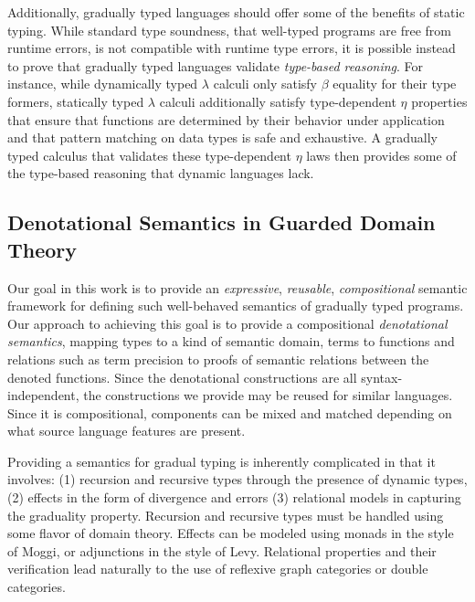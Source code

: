Additionally, gradually typed languages should offer some of the
benefits of static typing. While standard type soundness, that
well-typed programs are free from runtime errors, is not compatible
with runtime type errors, it is possible instead to prove that
gradually typed languages validate \emph{type-based reasoning}. For
instance, while dynamically typed $\lambda$ calculi only satisfy
$\beta$ equality for their type formers, statically typed $\lambda$
calculi additionally satisfy type-dependent $\eta$ properties that
ensure that functions are determined by their behavior under
application and that pattern matching on data types is safe and
exhaustive. A gradually typed calculus that validates these
type-dependent $\eta$ laws then provides some of the type-based
reasoning that dynamic languages lack.


\subsection{Denotational Semantics in Guarded Domain Theory}

Our goal in this work is to provide an \emph{expressive},
\emph{reusable}, \emph{compositional} semantic framework for defining
such well-behaved semantics of gradually typed programs.
%
Our approach to achieving this goal is to provide a compositional
\emph{denotational semantics}, mapping types to a kind of semantic
domain, terms to functions and relations such as term precision to
proofs of semantic relations between the denoted functions.
%
Since the denotational constructions are all syntax-independent, the
constructions we provide may be reused for similar languages. Since it
is compositional, components can be mixed and matched depending on
what source language features are present.

Providing a semantics for gradual typing is inherently complicated in
that it involves: (1) recursion and recursive types through the
presence of dynamic types, (2) effects in the form of divergence and
errors (3) relational models in capturing the graduality
property. Recursion and recursive types must be handled using some
flavor of domain theory. Effects can be modeled using monads in the
style of Moggi, or adjunctions in the style of
Levy\cite{moggi,levy}. Relational properties and their verification
lead naturally to the use of reflexive graph categories or double
categories\cite{reflgraphcats,doublecats}.

